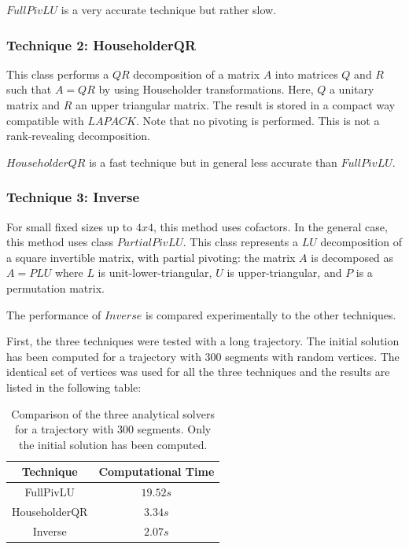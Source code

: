 $FullPivLU$ is a very accurate technique but rather slow.

\subsubsection{Technique 2: HouseholderQR}

This class performs a $QR$ decomposition of a matrix $A$ into matrices $Q$ and $R$ such that $A = QR$ by using Householder transformations. Here, $Q$ a unitary matrix and $R$ an upper triangular matrix. The result is stored in a compact way compatible with $LAPACK$. Note that no pivoting is performed. This is not a rank-revealing decomposition.\newline

$HouseholderQR$ is a fast technique but in general less accurate than $FullPivLU$.

\subsubsection{Technique 3: Inverse}
For small fixed sizes up to $4x4$, this method uses cofactors. In the general case, this method uses class $PartialPivLU$. This class represents a $LU$ decomposition of a square invertible matrix, with partial pivoting: the matrix $A$ is decomposed as $A = PLU$ where $L$ is unit-lower-triangular, $U$ is upper-triangular, and $P$ is a permutation matrix. \newline

The performance of $Inverse$ is compared experimentally to the other techniques. \newline

First, the three techniques were tested with a long trajectory. The initial solution has been computed for a trajectory with 300 segments with random vertices. The identical set of vertices was used for all the three techniques and the results are listed in the following table:

\begin{table}[H] 
\begin{center}
    \begin{tabular}{| c | c | }
    \hline
    Technique & Computational Time  \\ \hline
  FullPivLU  & $19.52s$\\ \hline
  HouseholderQR & $3.34s$\\ \hline
 Inverse & $2.07s$\\
    \hline
    \end{tabular}
    \caption{Comparison of the three analytical solvers for a trajectory with 300 segments. Only the initial solution has been computed.}
    \label{tab:300seg}
\end{center}
\end{table}

